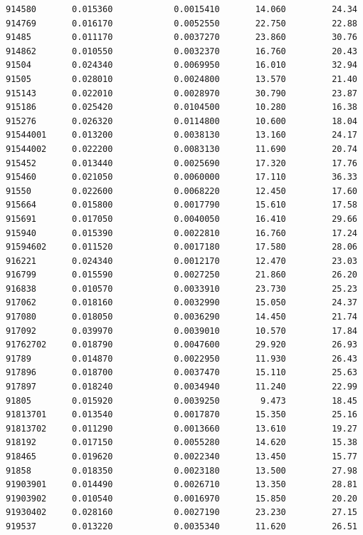 \documentclass[
  letterpaper,
  DIV=11,
  numbers=noendperiod]{scrartcl}
\begin{document}
\begin{verbatim}
914580       0.015360            0.0015410       14.060         24.34
914769       0.016170            0.0052550       22.750         22.88
91485        0.011170            0.0037270       23.860         30.76
914862       0.010550            0.0032370       16.760         20.43
91504        0.024340            0.0069950       16.010         32.94
91505        0.028010            0.0024800       13.570         21.40
915143       0.022010            0.0028970       30.790         23.87
915186       0.025420            0.0104500       10.280         16.38
915276       0.026320            0.0114800       10.600         18.04
91544001     0.013200            0.0038130       13.160         24.17
91544002     0.022200            0.0083130       11.690         20.74
915452       0.013440            0.0025690       17.320         17.76
915460       0.021050            0.0060000       17.110         36.33
91550        0.022600            0.0068220       12.450         17.60
915664       0.015800            0.0017790       15.610         17.58
915691       0.017050            0.0040050       16.410         29.66
915940       0.015390            0.0022810       16.760         17.24
91594602     0.011520            0.0017180       17.580         28.06
916221       0.024340            0.0012170       12.470         23.03
916799       0.015590            0.0027250       21.860         26.20
916838       0.010570            0.0033910       23.730         25.23
917062       0.018160            0.0032990       15.050         24.37
917080       0.018050            0.0036290       14.450         21.74
917092       0.039970            0.0039010       10.570         17.84
91762702     0.018790            0.0047600       29.920         26.93
91789        0.014870            0.0022950       11.930         26.43
917896       0.018700            0.0037470       15.110         25.63
917897       0.018240            0.0034940       11.240         22.99
91805        0.015920            0.0039250        9.473         18.45
91813701     0.013540            0.0017870       15.350         25.16
91813702     0.011290            0.0013660       13.610         19.27
918192       0.017150            0.0055280       14.620         15.38
918465       0.019620            0.0022340       13.450         15.77
91858        0.018350            0.0023180       13.500         27.98
91903901     0.014490            0.0026710       13.350         28.81
91903902     0.010540            0.0016970       15.850         20.20
91930402     0.028160            0.0027190       23.230         27.15
919537       0.013220            0.0035340       11.620         26.51

\end{verbatim}
\end{document}
